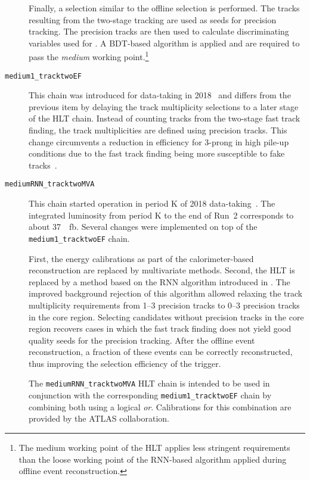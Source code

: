 \begin{description}
  Finally, a \tauhadvis selection similar to the offline \tauhadvis selection is
  performed. The tracks resulting from the two-stage tracking are used as seeds
  for precision tracking. The precision tracks are then used to calculate
  discriminating variables used for \tauid. A BDT-based \tauid algorithm
  is applied and \tauhadvis are required to pass the \emph{medium} working
  point.\footnote{The medium working point of the HLT \tauid applies less
    stringent requirements than the loose working point of the RNN-based \tauid
    algorithm applied during offline event reconstruction.}

\item[\texttt{medium1\_tracktwoEF}]
  This chain was introduced for data-taking in 2018~\cite{ATL-DAQ-PUB-2019-001}
  and differs from the previous item by delaying the track multiplicity
  selections to a later stage of the HLT chain. Instead of counting tracks from
  the two-stage fast track finding, the track multiplicities are defined using
  precision tracks. This change circumvents a reduction in efficiency for
  3-prong \tauhadvis in high pile-up conditions due to the fast track finding
  being more susceptible to fake tracks~\cite{ATL-DAQ-PUB-2019-001}.

\item[\texttt{mediumRNN\_tracktwoMVA}] This chain started operation in period K
  of 2018 data-taking~\cite{ATL-DAQ-PUB-2019-001}. The integrated luminosity
  from period K to the end of Run~2 corresponds to about
  \SI{37}{\per\femto\barn}. Several changes were implemented on top of the
  \texttt{medium1\_tracktwoEF} chain.

  First, the \tauhadvis energy calibrations as part of the calorimeter-based
  \tauhadvis reconstruction are replaced by multivariate methods. Second, the
  HLT \tauid is replaced by a method based on the RNN \tauid algorithm
  introduced in . The improved background rejection of this
  algorithm allowed relaxing the track multiplicity requirements from 1--3
  precision tracks to 0--3 precision tracks in the core region. Selecting
  \tauhadvis candidates without precision tracks in the core region recovers
  cases in which the fast track finding does not yield good quality seeds for
  the precision tracking. After the offline event reconstruction, a fraction of
  these events can be correctly reconstructed, thus improving the selection
  efficiency of the trigger.

  The \texttt{mediumRNN\_tracktwoMVA} HLT chain is intended to be used in
  conjunction with the corresponding \texttt{medium1\_tracktwoEF} chain by
  combining both using a logical \emph{or}. Calibrations for this combination
  are provided by the ATLAS collaboration.
\end{description}

